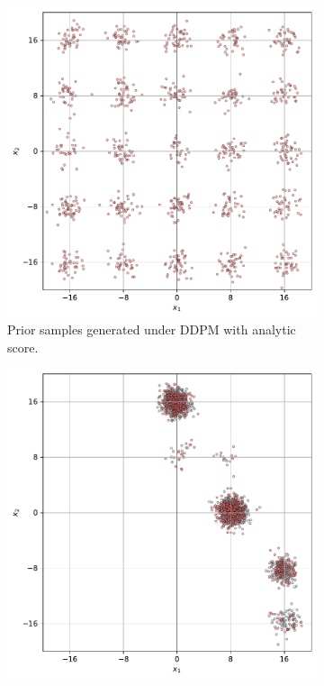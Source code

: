 \begin{figure}[t]
    \centering
    \begin{subfigure}[b]{0.48\textwidth}
      \centering
      \includegraphics[width=\textwidth]{assets/gmm_prior_samples.pdf}
      \caption{Prior samples generated under DDPM with analytic score.}
      \label{fig:gmm-prior}
    \end{subfigure}
    \hfill
    \begin{subfigure}[b]{0.48\textwidth}
      \centering
      \includegraphics[width=\textwidth]{assets/gmm_smc_samples.pdf}

\end{subfigure}
\end{figure}
